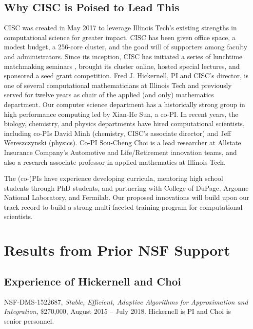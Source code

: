 \documentclass[11pt]{NSFamsart}
\begin{document}
\subsection*{Why CISC is Poised to Lead This}
CISC was created in May 2017 to leverage Illinois Tech’s existing strengths in computational science for greater impact.  CISC has been given office space, a modest budget, a 256-core cluster, and the good will of supporters among faculty and administrators.  Since its inception, CISC has initiated a series of lunchtime matchmaking seminars , brought its cluster online, hosted special lectures, and sponsored a seed grant competition. Fred J. Hickernell, PI and CISC’s director, is one of several computational mathematicians at Illinois Tech and previously served for twelve years as chair of the applied (and only) mathematics department.  Our computer science department has a historically strong group in high performance computing led by Xian-He Sun, a co-PI.  In recent years, the biology, chemistry, and physics departments have hired computational scientists, including co-PIs David Minh (chemistry, CISC's associate director) and Jeff Wereszczynski (physics).  Co-PI Sou-Cheng Choi is a lead researcher at Allstate Insurance Company's Automotive and Life/Retirement innovation teams, and also a research associate professor in applied mathematics at Illinois Tech.

The (co-)PIs have experience developing curricula, mentoring high school students through PhD students, and partnering with College of DuPage, Argonne National Laboratory, and Fermilab.  Our proposed innovations will build upon our track record to build a strong multi-faceted training program for computational scientists.

\section{Results from Prior NSF Support} 
\subsection{Experience of Hickernell and Choi}
NSF-DMS-1522687, \emph{Stable, Efficient, Adaptive Algorithms for Approximation and 
Integration}, \$270,000, August 2015 -- July 2018. \label{SectHickernellPrevious}  Hickernell is PI and Choi is senior personnel.  
\end{document}
